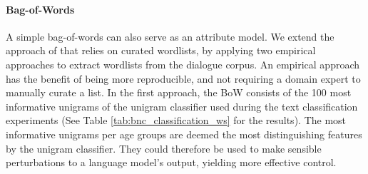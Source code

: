 \paragraph{Bag-of-Words} A simple bag-of-words can also serve as an attribute model. 
We extend the approach of \cite{dathathri2019plug} that relies on curated wordlists, by applying two empirical approaches to extract wordlists from the dialogue corpus. An empirical approach has the benefit of being more reproducible, and not requiring a domain expert to manually curate a list. In the first approach, the BoW consists of the 100 most informative unigrams of the unigram classifier used during the text classification experiments (See Table \ref{tab:bnc_classification_ws} for the results). The most informative unigrams per age groups are deemed the most distinguishing features by the unigram classifier. They could therefore be used to make sensible perturbations to a language model's output, yielding more effective control.

